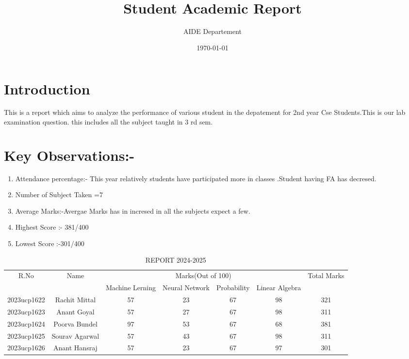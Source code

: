 \documentclass{article}
\title{\textbf{Student Academic Report}}
\author{AIDE Departement}
\date{\today}
\begin{document}
\maketitle

\section{Introduction}
This is a report which aims to analyze the performance of various student in the depatement for 2nd year Cse Students.This is our lab examination question.
this includes all the subject taught in 3 rd sem.
\section{Key Observations:-}
\begin{enumerate}
    \item Attendance percentage:- This year relatively students have participated more in classes .Student having FA has decresed.\\
    \item Number of Subject Taken =7\\
    \item Average Marks:-Avergae Marks has in incresed in all the subjects expect a few. 
    \item Highest Score :- 381/400
    \item Lowest Score  :-301/400
\end{enumerate}
\begin{table}[]
    \centering
    \begin{tabular}{|c|c|c|c|c|c|c|}
    \hline
         R.No & Name & \multicolumn{4}{|c|}{Marks(Out of 100)} & Total Marks\\
         \cline{3-6}
               &      & Machine Lerning & Neural Network & Probability &Linear Algebra& \\
        \hline
        2023ucp1622 & Rachit Mittal & 57 & 23 & 67 & 98 & 321\\
        \hline
        2023ucp1623 & Anant Goyal & 57 & 27 & 67 & 98 & 311\\
        \hline
        2023ucp1624 & Poorva Bundel & 97 & 53 & 67 & 68 & 381\\
        \hline
        2023ucp1625 & Sourav Agarwal & 57 & 43 & 67 & 98 & 311\\
        \hline
        2023ucp1626 & Anant Hansraj & 57 & 23 & 67 & 97 & 301\\
        \hline
         
    \end{tabular}
    \caption{REPORT 2024-2025}

\end{table}
\end{document}
